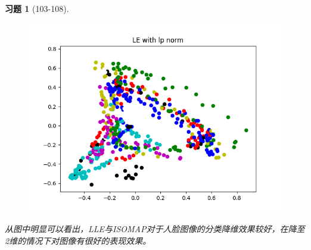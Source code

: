 \documentclass[a4paper, UTF8]{ctexart}
\newtheorem*{exercise}{\textbf{习题}}
\begin{document}
\begin{exercise}[103-108]
\begin{figure}[htbp!]
  		\includegraphics[width = \textwidth]{hw7_fig5.png}
  	\end{figure}
  	\clearpage
  	从图中明显可以看出，LLE与ISOMAP对于人脸图像的分类降维效果较好，在降至2维的情况下对图像有很好的表现效果。
  \end{exercise}
\end{document}
